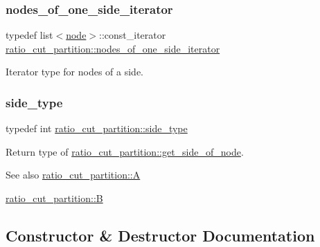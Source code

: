 \subsubsection{\texorpdfstring{nodes\+\_\+of\+\_\+one\+\_\+side\+\_\+iterator}{nodes\_of\_one\_side\_iterator}}
{\footnotesize\ttfamily typedef list$<$\mbox{\hyperlink{classnode}{node}}$>$\+::const\+\_\+iterator \mbox{\hyperlink{classratio__cut__partition_a4f667099b56ded1bfef8f1fb4d09f81c}{ratio\+\_\+cut\+\_\+partition\+::nodes\+\_\+of\+\_\+one\+\_\+side\+\_\+iterator}}}

Iterator type for nodes of a side. \mbox{\label{classratio__cut__partition_ace53442bd0c1e21fbf00858ec6f6b456}} 
\subsubsection{\texorpdfstring{side\+\_\+type}{side\_type}}
{\footnotesize\ttfamily typedef int \mbox{\hyperlink{classratio__cut__partition_ace53442bd0c1e21fbf00858ec6f6b456}{ratio\+\_\+cut\+\_\+partition\+::side\+\_\+type}}}

Return type of \mbox{\hyperlink{classratio__cut__partition_a3b0a7dcc26c9ca25016abf2cebf250fe}{ratio\+\_\+cut\+\_\+partition\+::get\+\_\+side\+\_\+of\+\_\+node}}.

\begin{DoxySeeAlso}{See also}
\mbox{\hyperlink{classratio__cut__partition_ae1a3cd1c2ede82023f9a229e40909139}{ratio\+\_\+cut\+\_\+partition\+::A}} 

\mbox{\hyperlink{classratio__cut__partition_adf075987228d8adc7950d5b1ba332daa}{ratio\+\_\+cut\+\_\+partition\+::B}} 
\end{DoxySeeAlso}


\subsection{Constructor \& Destructor Documentation}
\mbox{\label{classratio__cut__partition_a56e283d4ec5a06115146982e86c65878}} 
